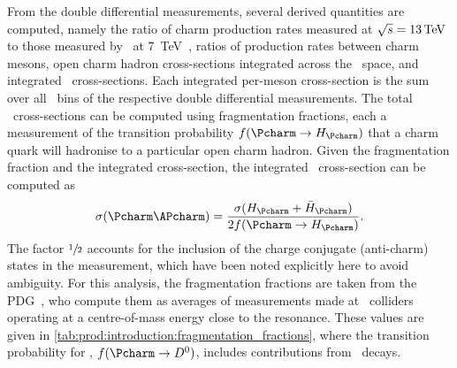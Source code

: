 \begin{table}
  \centering
  \caption{%
      Branching ratios for the different decay 
      modes~\cite{PDG2014,Alexander:2008aa}.
      The \DspTophipi\ branching fraction includes the branching fraction of 
      \phiToKK\@.
  }
  \label{tab:prod:introduction:branching_ratios}
  
\end{table}

From the double differential measurements, several derived quantities are 
computed, namely the ratio of charm production rates measured at $\sqrts = 
\SI{13}{\TeV}$ to those measured by \lhcb\ at 
\SI{7}{\TeV}~\cite{LHCb-PAPER-2012-041}, ratios of production rates between 
charm mesons, open charm hadron cross-sections integrated across the \pTy\ 
space, and integrated \ccbar\ cross-sections.
Each integrated per-meson cross-section is the sum over all \pTy\ bins of the 
respective double differential measurements.
The total \ccbar\ cross-sections can be computed using fragmentation fractions, 
each a measurement of the transition probability $f(\cToHc)$ that a charm quark 
will hadronise to a particular open charm hadron.
Given the fragmentation fraction and the integrated cross-section, the 
integrated \ccbar\ cross-section can be computed as
\begin{equation}
  \xsec{(\ccbar)} = \frac{\xsec(\PHc + \APHc)}{2f(\cToHc)}.
  \label{eqn:prod:introduction:ccbar_cross_section}
\end{equation}
The factor $\sfrac{1}{2}$ accounts for the inclusion of the charge conjugate 
(anti-charm) states in the measurement, which have been noted explicitly here 
to avoid ambiguity.
For this analysis, the fragmentation fractions are taken from the 
\ac{PDG}~\cite{PDG2008}, who compute them as averages of measurements made at 
\epem\ colliders operating at a centre-of-mass energy close to the 
\PUpsilonFourS resonance.
These values are given in \cref{tab:prod:introduction:fragmentation_fractions}, 
where the transition probability for \PDzero, $f(\decay{\Pcharm}{\PDzero})$, 
includes contributions from \DstToDzpi\ decays.

\begin{table}
  \caption[Charm hadron fragmentation fractions]{%
    Charm hadron fragmentation fractions~\cite{PDG2008}.
  }
  \label{tab:prod:introduction:fragmentation_fractions}
  \centering
  
\end{table}

